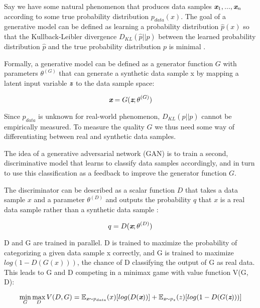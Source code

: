 \documentclass[a4paper,conference]{IEEEtran}
\def\mathbi#1{\textbf{\em #1}}
\begin{document}
Say we have some natural phenomenon that produces data samples $\mathbi{x}_1,...,\mathbi{x}_n$ according to some true probability distribution $p_{data}(x)$. The goal of a generative model can be defined as learning a probability distribution $\hat{p}(x)$ so that the Kullback-Leibler divergence $D_{KL}(\hat{p}||p)$ between the learned probability distribution $\hat{p}$ and the true probability distribution $p$ is minimal \cite{c1}. 

Formally, a generative model can be defined as a generator function $G$ with parameters $\theta^{(G)}$ that can generate a synthetic data sample x by mapping a latent input variable $\mathbi{z}$ to the data sample space:

\begin{dmath}
\mathbi{x} = G(\mathbi{z}; \mathbi{$\theta$}^{(G)}) 
\end{dmath}

Since $p_{data}$ is unknown for real-world phenomenon, $D_{KL}(\hat{p}||p)$ cannot be empirically measured. To measure the quality $G$ we thus need some way of differentiating between real and synthetic data samples.

The idea of a generative adversarial network (GAN) is to train a second, discriminative model that learns to classify data samples accordingly, and in turn to use this classification as a feedback to improve the generator function $G$.

The discriminator can be described as a scalar function $D$ that takes a data sample $x$ and a parameter $\theta^{(D)}$ and outputs the probability $q$ that $x$ is a real data sample rather than a synthetic data sample \cite{c2}:

\begin{dmath}
q = D(\mathbi{x}; \mathbi{$\theta$}^{(D)})
\end{dmath}

D and G are trained in parallel. D is trained to maximize the probability of categorizing a given data sample x correctly, and G is trained to maximize $log(1-D(G(x)))$, the chance of D classifying the output of G as real data. This leads to G and D competing in a minimax game with value function V(G, D):

\begin{dmath}
\min_{G} \max_{D} V(D, G) = \\
\mathbb{E}_{\mathbi{x} \sim p_{data}}(x)[log (D(\mathbi{x}))] + \mathbb{E}_{\mathbi{z} \sim p_{z}}(z)[log (1-D(G(\mathbi{z})))]
\end{dmath}
\end{document}
